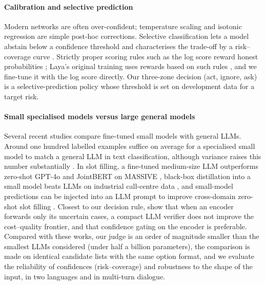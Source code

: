 \paragraph{Calibration and selective prediction}
Modern networks are often over-confident; temperature scaling \citep{guo2017calibration} and isotonic regression \citep{zadrozny2002transforming} are simple post-hoc corrections. Selective classification lets a model abstain below a confidence threshold and characterises the trade-off by a risk--coverage curve \citep{geifman2017selective}. Strictly proper scoring rules such as the log score reward honest probabilities \citep{gneiting2007scoring}; Laya's original training uses rewards based on such rules \citep{laya2026}, and we fine-tune it with the log score directly. Our three-zone decision (act, ignore, ask) is a selective-prediction policy whose threshold is set on development data for a target risk.

\paragraph{Small specialised models versus large general models}
Several recent studies compare fine-tuned small models with general LLMs. Around one hundred labelled examples suffice on average for a specialised small model to match a general LLM in text classification, although variance raises this number substantially \citep{pecher2025comparing}. In slot filling, a fine-tuned medium-size LLM outperforms zero-shot GPT-4o and JointBERT on MASSIVE \citep{aguirre2025finetuning}, black-box distillation into a small model beats LLMs on industrial call-centre data \citep{rana2025zeroshot}, and small-model predictions can be injected into an LLM prompt to improve cross-domain zero-shot slot filling \citep{li2025synergistic}. Closest to our decision rule, \citet{tikhomirov2026selection} show that when an encoder forwards only its uncertain cases, a compact LLM verifier does not improve the cost--quality frontier, and that confidence gating on the encoder is preferable. Compared with these works, our judge is an order of magnitude smaller than the smallest LLMs considered (under half a billion parameters), the comparison is made on identical candidate lists with the same option format, and we evaluate the reliability of confidences (risk--coverage) and robustness to the shape of the input, in two languages and in multi-turn dialogue.

